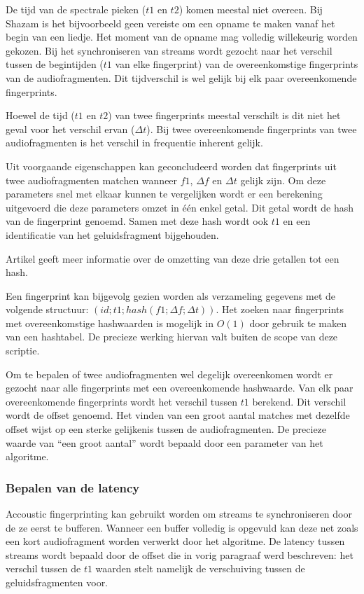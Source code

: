 De tijd van de spectrale pieken ($t1$ en $t2$) komen meestal niet overeen. Bij Shazam is het bijvoorbeeld geen vereiste om een opname te maken vanaf het begin van een liedje. Het moment van de opname mag volledig willekeurig worden gekozen. Bij het synchroniseren van streams wordt gezocht naar het verschil tussen de begintijden ($t1$ van elke fingerprint) van de overeenkomstige fingerprints van de audiofragmenten. Dit tijdverschil is wel gelijk bij elk paar overeenkomende fingerprints.

Hoewel de tijd ($t1$ en $t2$) van twee fingerprints meestal verschilt is dit niet het geval voor het verschil ervan ($\Delta t$). Bij twee overeenkomende fingerprints van twee audiofragmenten is het verschil in frequentie inherent gelijk.

Uit voorgaande eigenschappen kan geconcludeerd worden dat fingerprints uit twee audiofragmenten matchen wanneer $ f1 $, $ \Delta f $ en $ \Delta t $ gelijk zijn. Om deze parameters snel met elkaar kunnen te vergelijken wordt er een berekening uitgevoerd die deze parameters omzet in één enkel getal. Dit getal wordt de hash van de fingerprint genoemd. Samen met deze hash wordt ook $ t1 $ en een identificatie van het geluidsfragment bijgehouden.

Artikel \cite{six2014panako} geeft meer informatie over de omzetting van deze drie getallen tot een hash.

Een fingerprint kan bijgevolg gezien worden als verzameling gegevens met de volgende structuur: $ ( id; t1; hash(f1; \Delta f; \Delta t) ) $. Het zoeken naar fingerprints met overeenkomstige hashwaarden is mogelijk in $O(1)$ door gebruik te maken van een hashtabel. De precieze werking hiervan valt buiten de scope van deze scriptie.

Om te bepalen of twee audiofragmenten wel degelijk overeenkomen wordt er gezocht naar alle fingerprints met een overeenkomende hashwaarde. Van elk paar overeenkomende fingerprints wordt het verschil tussen $ t1 $ berekend. Dit verschil wordt de offset genoemd. Het vinden van een groot aantal matches met dezelfde offset wijst op een sterke gelijkenis tussen de audiofragmenten. De precieze waarde van ``een groot aantal'' wordt bepaald door een parameter van het algoritme.

\subsubsection{Bepalen van de latency}

Accoustic fingerprinting kan gebruikt worden om streams te synchroniseren door de ze eerst te bufferen. Wanneer een buffer volledig is opgevuld kan deze net zoals een kort audiofragment worden verwerkt door het algoritme. De latency tussen streams wordt bepaald door de offset die in vorig paragraaf werd beschreven: het verschil tussen de $ t1 $ waarden stelt namelijk de verschuiving tussen de geluidsfragmenten voor.

